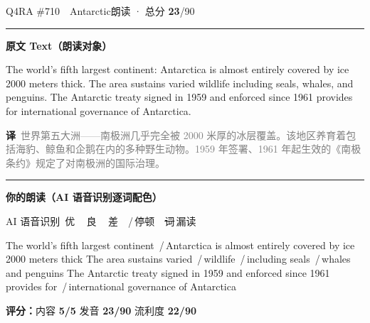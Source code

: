 \documentclass[11pt]{article}
\newcommand{\sfull}[1]{\textcolor{cFix}{\bfseries #1}}     %
\newcommand{\spart}[1]{\textcolor{cPartial}{\bfseries #1}} %
\newcommand{\ptesub}[1]{%
  \par\needspace{2\baselineskip}\smallskip
  {\color{cAccent}\rule[-0.2ex]{3pt}{1.05em}}\hspace{6pt}%
  {\bfseries\color{cHead}#1}\par\nopagebreak\smallskip}
\newcommand{\sg}[1]{\textcolor{cSpkGood}{#1}}   %
\newcommand{\sy}[1]{\textcolor{cSpkOk}{#1}}     %
\newcommand{\sr}[1]{\textcolor{cSpkBad}{#1}}    %
\newcommand{\pse}{{\color{gray}\,/\,}}          %
\newcommand{\asrlegend}{{\footnotesize\color{gray}AI 语音识别\quad
  {\color{cSpkGood}\textbullet}\,优\ \ {\color{cSpkOk}\textbullet}\,良\ \
  {\color{cSpkBad}\textbullet}\,差\ \ {\color{gray}/}\,停顿\ \
  {\color{cSpkBad}\sout{词}}\,漏读}}
\newcommand{\zh}[1]{{\footnotesize\textcolor{cNote}{\textbf{译}}\ \textcolor{gray}{#1}}}
\begin{document}
\begin{qblock}{Q4\quad RA \#710\ \ Antarctic}{朗读 · 总分 \textcolor{cAccent}{\bfseries 23}/90}
\ptesub{原文 Text（朗读对象）}
\begin{promptbox}
The world's fifth largest continent: Antarctica is almost entirely covered by ice 2000 meters thick. The area sustains varied wildlife including seals, whales, and penguins. The Antarctic treaty signed in 1959 and enforced since 1961 provides for international governance of Antarctica.
\end{promptbox}
\zh{世界第五大洲——南极洲几乎完全被 2000 米厚的冰层覆盖。该地区养育着包括海豹、鲸鱼和企鹅在内的多种野生动物。1959 年签署、1961 年起生效的《南极条约》规定了对南极洲的国际治理。}
\ptesub{你的朗读（AI 语音识别逐词配色）}
\asrlegend
\begin{asrbox}
\sg{The} \sg{world's} \sg{fifth} \sg{largest} \sy{continent} \pse \sr{Antarctica} \sg{is} \sg{almost} \sg{entirely} \sg{covered} \sg{by} \sr{ice} \sg{2000} \sg{meters} \sg{thick} \sy{The} \sg{area} \sg{sustains} \sg{varied} \pse \sy{wildlife} \pse \sg{including} \sy{seals} \pse \sy{whales} \sg{and} \sg{penguins} \sr{The} \sr{Antarctic} \sg{treaty} \sg{signed} \sg{in} \sg{1959} \sg{and} \sg{enforced} \sy{since} \sg{1961} \sg{provides} \sg{for} \pse \sg{international} \sg{governance} \sg{of} \sg{Antarctica}
\end{asrbox}
\smallskip
{\small\textbf{评分：}内容 \sfull{5/5} \quad\textperiodcentered\quad 发音 \spart{23/90} \quad\textperiodcentered\quad 流利度 \spart{22/90}}\quad{\footnotesize\color{gray}（用时 01:06）}
\end{qblock}
\end{document}
